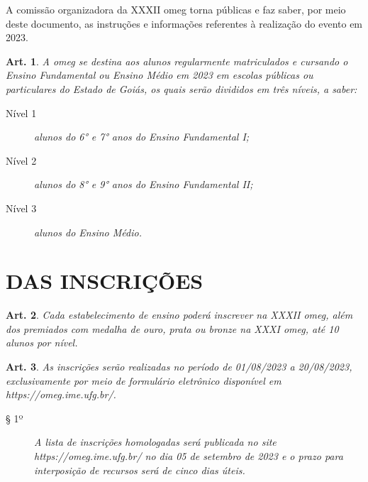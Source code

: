 \documentclass[a4paper,12pt]{article}
\newtheorem{article}{Art.}
\begin{document}
A comissão organizadora da XXXII \acrfull{omeg} torna públicas e faz saber, por meio deste documento, as instruções e informações referentes à realização do evento em 2023.

\begin{article}
  A \acrshort{omeg} se destina aos alunos regularmente matriculados e cursando o Ensino
  Fundamental ou Ensino Médio em 2023 em escolas públicas ou particulares do
  Estado de Goiás, os quais serão divididos em três níveis, a saber:
  \begin{description}
    \item[Nível 1] alunos do 6° e 7° anos do Ensino Fundamental I;
    \item[Nível 2] alunos do 8° e 9° anos do Ensino Fundamental II;
    \item[Nível 3] alunos do Ensino Médio.
  \end{description}
\end{article}

\section{DAS INSCRIÇÕES}

\begin{article}
  Cada estabelecimento de ensino poderá inscrever na XXXII \acrshort{omeg}, além dos
  premiados com medalha de ouro, prata ou bronze na XXXI \acrshort{omeg}, até 10
  alunos por nível.
\end{article}

\begin{article}
  As inscrições serão realizadas no período de 01/08/2023 a 20/08/2023,
  exclusivamente por meio de formulário eletrônico disponível em
  https://omeg.ime.ufg.br/.
  \begin{description}
    \item[§ 1º]
      A lista de inscrições homologadas será publicada no site
      https://omeg.ime.ufg.br/ no dia 05 de setembro de 2023 e o prazo para
      interposição de recursos será de cinco dias úteis.
  \end{description}
\end{article}
\end{document}
